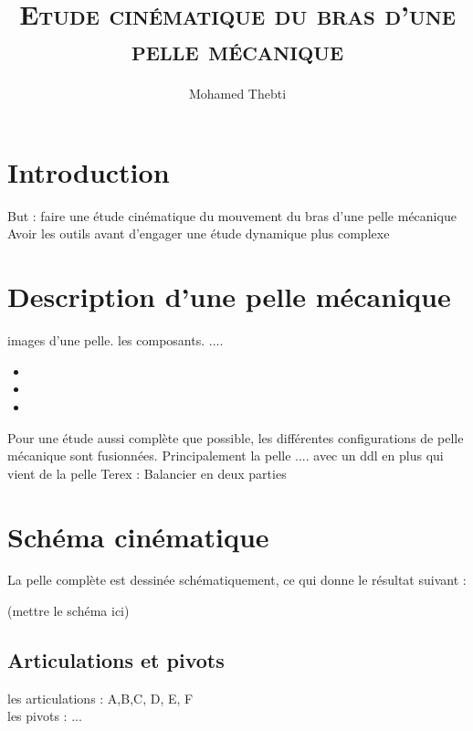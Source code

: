 \documentclass[12pt,a4paper]{article}
\title{
	\Huge\textsc{Etude cinématique du bras d'une pelle mécanique}
}
\author{Mohamed Thebti}
\begin{document}
\setlength{\parindent}{0mm}

\fancyhead[R]{\slshape \leftmark}

\fancyfoot[C]{}
\fancyfoot[R]{\thepage}

\maketitle
\newpage

\tableofcontents

\newpage



\section{Introduction}

But : faire une étude cinématique du mouvement du bras d'une pelle mécanique
\medbreak
Avoir les outils avant d'engager une étude dynamique plus complexe 

\newpage
\section{Description d'une pelle mécanique}
images d'une pelle. les composants. ....
\begin{itemize}
	\item 
	\item 
	\item 
\end{itemize}

Pour une étude aussi complète que possible, les différentes configurations de pelle mécanique sont fusionnées. Principalement la pelle .... avec un ddl en plus qui vient de la pelle Terex : Balancier en deux parties 

\newpage
\section{Schéma cinématique}
La pelle complète est dessinée schématiquement, ce qui donne le résultat suivant : 

(mettre le schéma ici)
\subsection{Articulations et pivots}
les articulations : A,B,C, D, E, F\\
les pivots : ...\\
\end{document}
